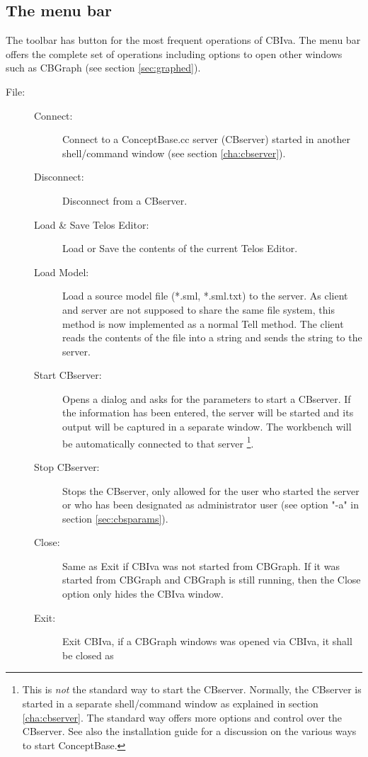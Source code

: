 \subsection{The menu bar}
\label{sec:menubar}

The toolbar has button for the most frequent operations of CBIva. The menu bar offers the complete set
of operations including options to open other windows such as CBGraph (see section \ref{sec:graphed}).

\begin{description}
\item[File:]
	\begin{description}
	\item[Connect:] Connect to a ConceptBase.cc server (CBserver) started in another shell/command window (see section \ref{cha:cbserver}).
	\item[Disconnect:] Disconnect from a CBserver.
	\item[Load \& Save Telos Editor:] Load or Save the contents of the current
	Telos Editor.
	\item[Load Model:] Load a source model file (*.sml, *.sml.txt) to the server. As client and server are not supposed
	to share the same file system, this method is now implemented as a normal Tell method. The client
	reads the contents of the file into a string and sends the string to the server.
	\item[Start CBserver:] Opens a dialog and asks for the parameters to start a CBserver.
	If the information has been entered, the server will be started
	and its output will be captured in a separate window. The workbench will
	be automatically connected to that server%
\footnote{This is {\em not\/} the standard way to start the CBserver. Normally, the CBserver
is started in a separate shell/command window as explained in section \ref{cha:cbserver}. The standard
way offers more options and control over the CBserver. See also the installation guide for
a discussion on the various ways to start ConceptBase.}.
	\item[Stop CBserver:] Stops the CBserver, only allowed for the user who started the server
         or who has been designated as administrator user (see option "-a" in section \ref{sec:cbsparams}).
	\item[Close:] Same as Exit if CBIva was not started from CBGraph. If it was started from CBGraph
        and CBGraph is still running, then the Close option only hides the CBIva window.
	\item[Exit:] Exit CBIva, if a CBGraph windows was opened via CBIva, it shall be closed as

\end{description}
\end{description}
